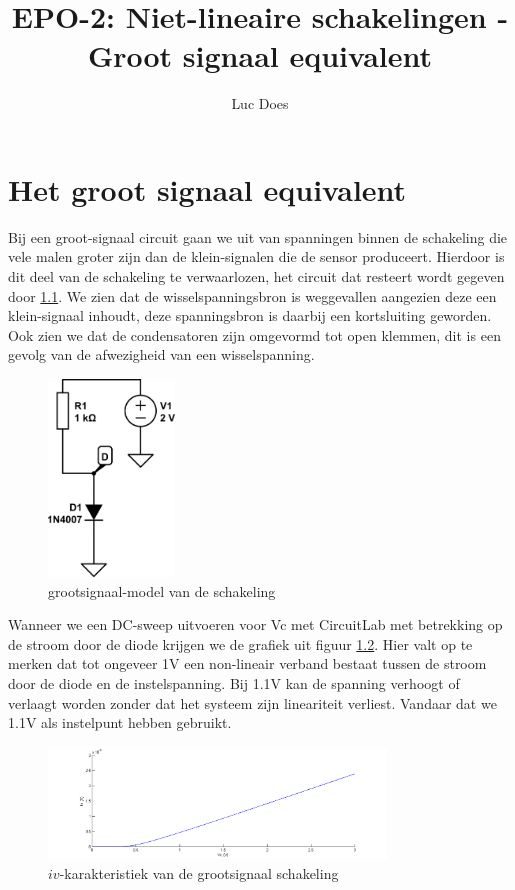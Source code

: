 \documentclass{report}
\title{EPO-2: Niet-lineaire schakelingen - Groot signaal equivalent}
\author{Luc Does}
\begin{document}
\chapter{Het groot signaal equivalent}
\label{ch:Groot signaal equivalent}

Bij een groot-signaal circuit gaan we uit van spanningen binnen de schakeling die vele malen groter zijn dan de klein-signalen die de sensor produceert. Hierdoor is dit deel van de schakeling te verwaarlozen, het circuit dat resteert wordt gegeven door \ref{fig:groot}.
We zien dat de wisselspanningsbron is weggevallen aangezien deze een klein-signaal inhoudt, deze spanningsbron is daarbij een kortsluiting geworden. Ook zien we dat de condensatoren zijn omgevormd tot open klemmen, dit is een gevolg van de afwezigheid van een wisselspanning.
\begin{figure}[H]
	\centering
	\includegraphics[width=0.3\textwidth]{grootsignaalmodel.png}
	\caption{grootsignaal-model van de schakeling}
	\label{fig:groot}
\end{figure}

\noindent Wanneer we een DC-sweep uitvoeren voor Vc met CircuitLab met betrekking op de stroom door de diode krijgen we de grafiek uit figuur \ref{fig:iv-groot}. Hier valt op te merken dat tot ongeveer 1V een non-lineair verband bestaat tussen de stroom door de diode en de instelspanning. Bij 1.1V kan de spanning verhoogt of verlaagt worden zonder dat het systeem zijn lineariteit verliest. Vandaar dat we 1.1V als instelpunt hebben gebruikt.

\begin{figure}[H]
	\centering
	\includegraphics[width=0.8\textwidth]{iv-groot.png}
	\caption{$iv$-karakteristiek van de grootsignaal schakeling}
	\label{fig:iv-groot}
\end{figure}
\end{document}
